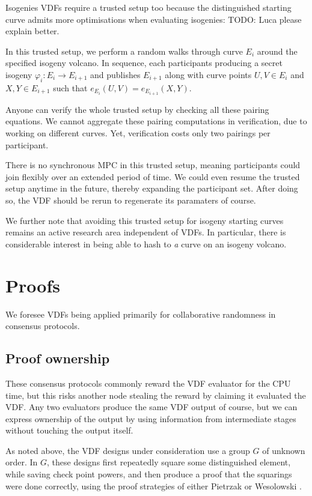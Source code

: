 \documentclass{article}
\begin{document}
Isogenies VDFs require a trusted setup too because the distinguished
starting curve admits more optimisations when evaluating isogenies:
TODO: Luca please explain better.

In this trusted setup, we perform a random walks through curve $E_i$
around the specified isogeny volcano.  In sequence, each participants
producing a secret isogeny $φ_i : E_i \to E_{i+1}$ and publishes
$E_{i+1}$ along with curve points $U,V ∈ E_i$ and $X,Y ∈ E_{i+1}$
such that $e_{E_i}(U,V) = e_{E_{i+1}}(X,Y)$.  

Anyone can verify the whole trusted setup by checking all these
pairing equations.  We cannot aggregate these pairing computations
in verification, due to working on different curves.  Yet, verification
costs only two pairings per participant.

There is no synchronous MPC in this trusted setup, meaning participants
could join flexibly over an extended period of time.  We could even
resume the trusted setup anytime in the future, thereby expanding the
participant set.  After doing so, the VDF should be rerun to
regenerate its paramaters of course.

We further note that avoiding this trusted setup for isogeny starting
curves remains an active research area independent of VDFs. 
In particular, there is considerable interest in being able to hash to
{\it a} curve on an isogeny volcano.


\section{Proofs}

We foresee VDFs being applied primarily for collaborative randomness
in consensus protocols.  

\subsection{Proof ownership}

These consensus protocols commonly reward the VDF evaluator for the
CPU time, but this risks another node stealing the reward by claiming
it evaluated the VDF.  Any two evaluators produce the same VDF output
of course, but we can express ownership of the output by using
information from intermediate stages without touching the output itself.

As noted above, the VDF designs under consideration use a group $G$
of unknown order.  In $G$, these designs first repeatedly square
some distinguished element, while saving check point powers, and
then produce a proof that the squarings were done correctly, using
the proof strategies of
 either Pietrzak \cite{Pietrzak} or Wesolowski \cite{Wesolowski}.
\end{document}
